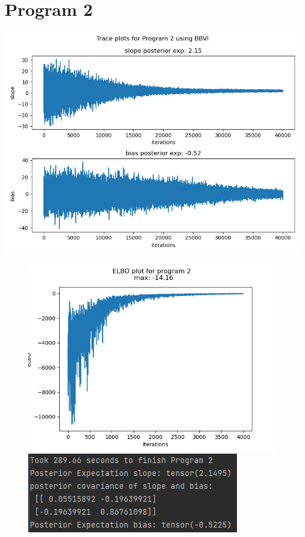 \documentclass[10pt]{homeworg}
\begin{document}
\section*{Program 2}
\begin{center}
\includegraphics[scale=0.5]{figures/BBVI_program_2.png}
\end{center}

\begin{figure}[!htbp]
    \centering
    \begin{minipage}{0.45\textwidth}
        \centering
       \includegraphics[scale=0.5]{figures/elbo_program_2.png}
    \end{minipage}\hfill
    \begin{minipage}{0.45\textwidth}
        \centering
        \includegraphics[scale=0.8]{figures/program2_time.png}
    \end{minipage}
\end{figure}
\end{document}
